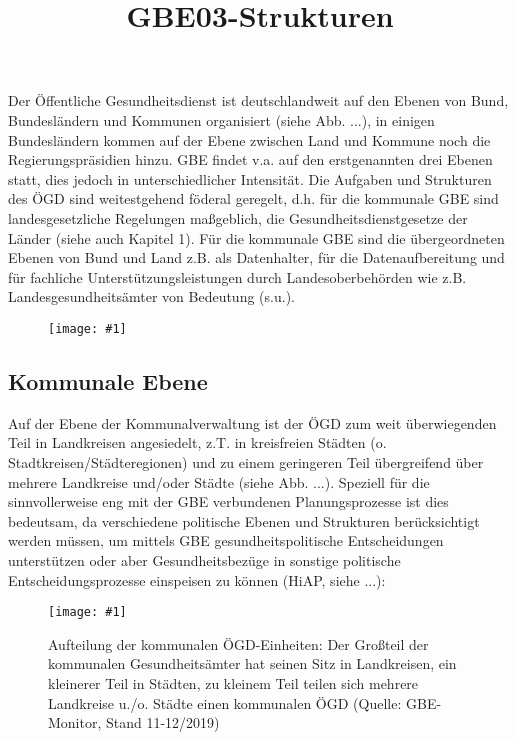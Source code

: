 \documentclass{article}
\newlength{\imgwidth}
\newcommand\scaledgraphics[2]{%
                
\settowidth{\imgwidth}{\texttt{[image: \#1]}}%
                
\setlength{\imgwidth}{\minof{\imgwidth}{#2\textwidth}}%
                
\texttt{[image: \#1]}%
                
}
\begin{document}
\title{GBE03-Strukturen}

\maketitle


Der Öffentliche Gesundheitsdienst ist deutschlandweit auf den Ebenen von Bund, Bundesländern und Kommunen organisiert (siehe Abb. ...), in einigen Bundesländern kommen auf der Ebene zwischen Land und Kommune noch die Regierungspräsidien hinzu. GBE findet v.a. auf den erstgenannten drei Ebenen statt, dies jedoch in unterschiedlicher Intensität. Die Aufgaben und Strukturen des ÖGD sind weitestgehend föderal geregelt, d.h. für die kommunale GBE sind landesgesetzliche Regelungen maßgeblich, die Gesundheitsdienstgesetze der Länder (siehe auch Kapitel 1). Für die kommunale GBE sind die übergeordneten Ebenen von Bund und Land z.B. als Datenhalter, für die Datenaufbereitung und für fachliche Unterstützungsleistungen durch Landesoberbehörden wie z.B. Landesgesundheitsämter von Bedeutung (s.u.).


\begin{center}
\begin{figure}
\scaledgraphics{d56120d9-69fe-4a3b-a811-9306cf7f61c5.png}{0.75}
\label{F93283101}
\end{figure}


\end{center}


\subsection{Kommunale Ebene}\label{H6814286}



Auf der Ebene der Kommunalverwaltung ist der ÖGD zum weit überwiegenden Teil in Landkreisen angesiedelt, z.T. in kreisfreien Städten (o. Stadtkreisen/Städteregionen) und zu einem geringeren Teil übergreifend über mehrere Landkreise und/oder Städte (siehe Abb. ...). Speziell für die sinnvollerweise eng mit der GBE verbundenen Planungsprozesse ist dies bedeutsam, da verschiedene politische Ebenen und Strukturen berücksichtigt werden müssen, um mittels GBE gesundheitspolitische Entscheidungen unterstützen oder aber Gesundheitsbezüge in sonstige politische Entscheidungsprozesse einspeisen zu können (HiAP, siehe ...):


{\raggedleft
\begin{figure}
\scaledgraphics{28019e22-b187-4465-8df9-aa8eebc93ca1.png}{0.75}
\caption*{Aufteilung der kommunalen ÖGD-Einheiten: Der Großteil der kommunalen Gesundheitsämter hat seinen Sitz in Landkreisen, ein kleinerer Teil in Städten, zu kleinem Teil teilen sich mehrere Landkreise u./o. Städte einen kommunalen ÖGD (Quelle: GBE-Monitor, Stand 11-12/2019)}\label{F85841541}
\end{figure}


}
\end{document}
